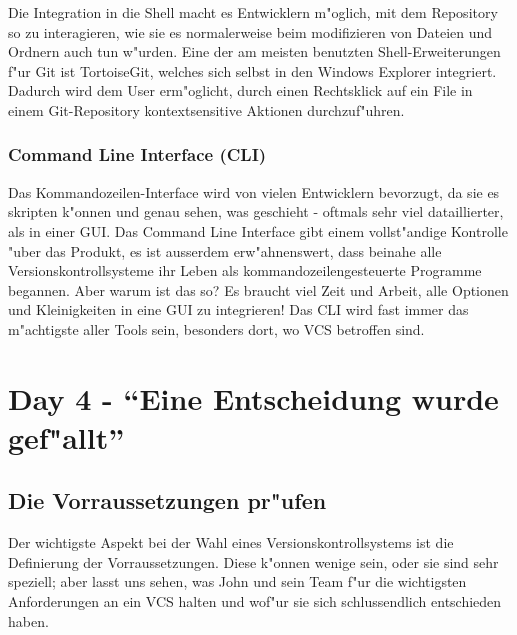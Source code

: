 Die Integration in die Shell macht es Entwicklern m"oglich, mit dem Repository so zu interagieren, wie sie es normalerweise beim modifizieren von Dateien und Ordnern auch tun w"urden. Eine der am meisten benutzten Shell-Erweiterungen f"ur Git ist TortoiseGit, welches sich selbst in den Windows Explorer integriert. Dadurch wird dem User erm"oglicht, durch einen Rechtsklick auf ein File in einem Git-Repository kontextsensitive Aktionen durchzuf"uhren.

\subsubsection{Command Line Interface (CLI)}

Das Kommandozeilen-Interface wird von vielen Entwicklern bevorzugt, da sie es skripten k"onnen und genau sehen, was geschieht - oftmals sehr viel dataillierter, als in einer GUI. Das Command Line Interface gibt einem vollst"andige Kontrolle "uber das Produkt, es ist ausserdem erw"ahnenswert, dass beinahe alle Versionskontrollsysteme ihr Leben als kommandozeilengesteuerte Programme begannen. Aber warum ist das so? Es braucht viel Zeit und Arbeit, alle Optionen und Kleinigkeiten in eine GUI zu integrieren! Das CLI wird fast immer das m"achtigste aller Tools sein, besonders dort, wo VCS betroffen sind. 

\section{Day 4 - ``Eine Entscheidung wurde gef"allt''}

\subsection{Die Vorraussetzungen pr"ufen}

Der wichtigste Aspekt bei der Wahl eines Versionskontrollsystems ist die Definierung der Vorraussetzungen. Diese k"onnen wenige sein, oder sie sind sehr speziell; aber lasst uns sehen, was John und sein Team f"ur die wichtigsten Anforderungen an ein VCS halten und wof"ur sie sich schlussendlich entschieden haben.

